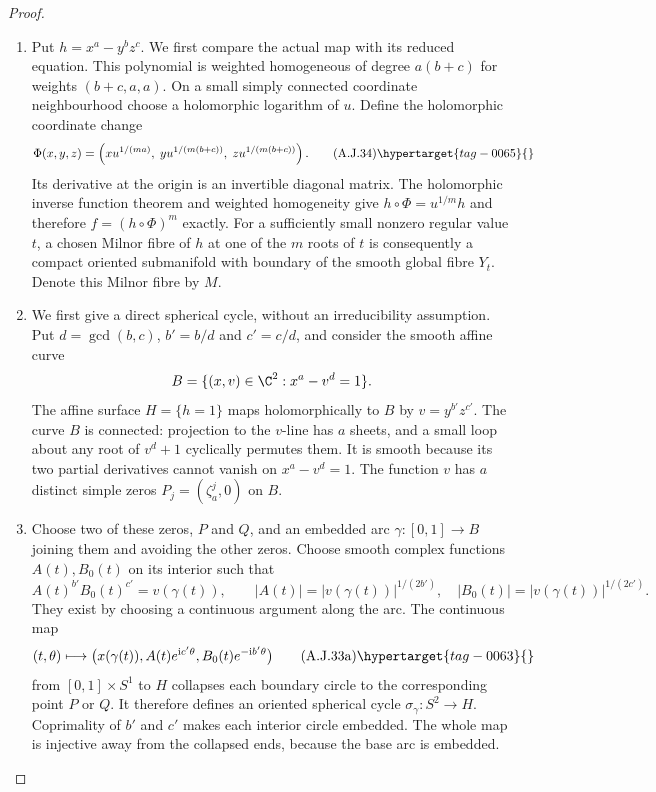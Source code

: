 \begin{proof}

\begin{enumerate}[label={$\langle1\rangle$\arabic*.},leftmargin=*]
\item Put $h=x^a-y^bz^c$. We first compare the actual map
with its reduced equation. This polynomial is weighted
homogeneous of degree $a(b+c)$ for weights
$(b+c,a,a)$. On a small simply connected coordinate
neighbourhood choose a holomorphic logarithm of $u$.
Define the holomorphic coordinate change
\[
 \Phi(x,y,z)=\left(
 x u^{1/(ma)},\;
 y u^{1/(m(b+c))},\;
 z u^{1/(m(b+c))}\right).
                                                        \tag{A.J.34}\hypertarget{tag-0065}{}\label{cdp:eq:A.J.34}
\]
Its derivative at the origin is an invertible diagonal
matrix. The holomorphic inverse function theorem and
weighted homogeneity give
$h\circ\Phi=u^{1/m}h$ and therefore
$f=(h\circ\Phi)^m$ exactly. For a sufficiently small
nonzero regular value $t$, a chosen Milnor fibre of
$h$ at one of the $m$ roots of $t$ is consequently a
compact oriented submanifold with boundary of the
smooth global fibre $Y_t$. Denote this Milnor fibre
by $M$.

\item We first give a direct spherical cycle, without an
irreducibility assumption. Put $d=\gcd(b,c)$,
$b'=b/d$ and $c'=c/d$, and consider the smooth affine
curve
\[
 B=\{(x,v)\in\C^2:x^a-v^d=1\}.
\]
The affine surface $H=\{h=1\}$ maps holomorphically
to $B$ by $v=y^{b'}z^{c'}$. The curve $B$ is
connected: projection to the $v$-line has $a$ sheets,
and a small loop about any root of $v^d+1$ cyclically
permutes them. It is smooth because its two partial
derivatives cannot vanish on $x^a-v^d=1$.
The function $v$ has $a$ distinct simple zeros
$P_j=(\zeta_a^j,0)$ on $B$.

\item Choose two of these zeros, $P$ and $Q$, and an
embedded arc $\gamma:[0,1]\to B$ joining them and
avoiding the other zeros. Choose smooth complex
functions $A(t),B_0(t)$ on its interior such that
\[
 A(t)^{b'}B_0(t)^{c'}=v(\gamma(t)),\qquad
 |A(t)|=|v(\gamma(t))|^{1/(2b')},\quad
 |B_0(t)|=|v(\gamma(t))|^{1/(2c')}.
\]
They exist by choosing a continuous argument along
the arc. The continuous map
\[
 (t,\theta)\longmapsto
 \bigl(x(\gamma(t)),A(t)e^{\mathrm i c'\theta},
                 B_0(t)e^{-\mathrm i b'\theta}\bigr)
                                                        \tag{A.J.33a}\hypertarget{tag-0063}{}\label{cdp:eq:A.J.33a}
\]
from $[0,1]\times S^1$ to $H$ collapses each boundary
circle to the corresponding point $P$ or $Q$.
It therefore defines an oriented spherical cycle
$\sigma_\gamma:S^2\to H$. Coprimality of $b'$ and
$c'$ makes each interior circle embedded. The whole
map is injective away from the collapsed ends,
because the base arc is embedded.


\end{enumerate}
\end{proof}
